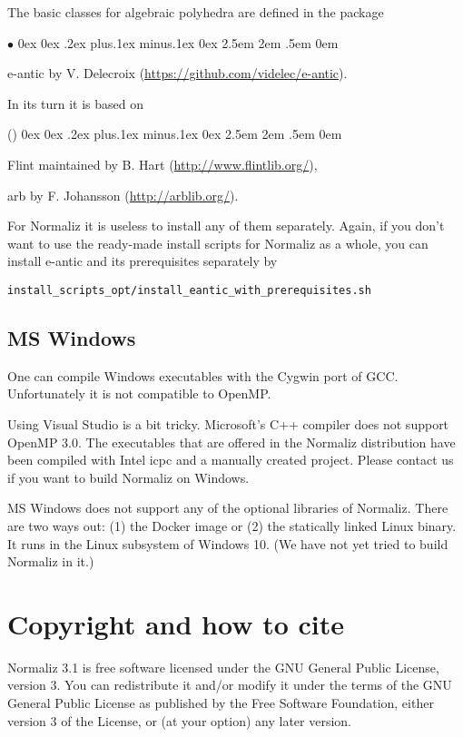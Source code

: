 \documentclass[12pt,a4paper]{scrartcl}
\newcounter{listi}
\newcommand{\stdli}{ \topsep0ex \partopsep0ex %
\parsep.2ex plus.1ex minus.1ex \itemsep0ex%
\leftmargin2.5em \labelwidth2em \labelsep.5em \rightmargin0em}%
\newenvironment{arab}{\begin{list}{\textup{(\arabic{listi})}}%
	{\usecounter{listi}\stdli}}{\end{list}}
\renewenvironment{itemize}{\begin{list}{{$\bullet$}}{\stdli}}{\end{list}}
\theoremstyle{definition}
\begin{document}
The basic classes for algebraic polyhedra are defined in the package
\begin{itemize}
	\item[]  e-antic by V. Delecroix (\url{https://github.com/videlec/e-antic}).
\end{itemize}
In its turn it is based on
\begin{arab}
	\item Flint maintained by B. Hart (\url{http://www.flintlib.org/}),
	\item arb by F. Johansson (\url{http://arblib.org/}).
\end{arab}

For Normaliz it is useless to install any of them separately. Again, if you don't want to use the ready-made install scripts for Normaliz as a whole, you can install e-antic and its prerequisites separately by
\begin{Verbatim}
install_scripts_opt/install_eantic_with_prerequisites.sh
\end{Verbatim}

\subsection{MS Windows}

One can compile Windows executables with the Cygwin port of GCC. Unfortunately it is not compatible to OpenMP.

Using Visual Studio is a bit tricky. Microsoft's C++ compiler does not support OpenMP 3.0.  The executables that are offered in the Normaliz distribution have been compiled with Intel icpc and a manually created project. Please contact us if you want to build Normaliz on Windows.

MS Windows does not support any of the optional libraries of Normaliz. There are two ways out: (1) the Docker image or (2) the statically linked Linux binary. It runs in the Linux subsystem of Windows 10. (We have not yet tried to build Normaliz in it.)

\section{Copyright and how to cite}

Normaliz 3.1 is free software licensed under the GNU General
Public License, version 3. You can redistribute it and/or
modify it under the terms of the GNU General Public License as
published by the Free Software Foundation, either version 3 of
the License, or (at your option) any later version.
\end{document}
